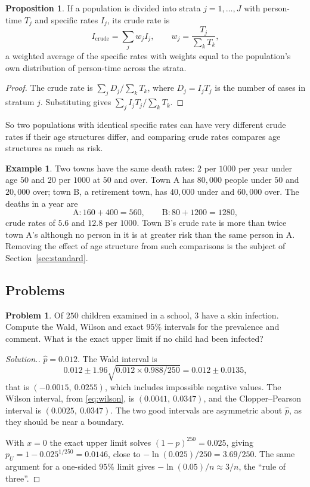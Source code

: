 \documentclass[11pt,a4paper]{article}
\numberwithin{equation}{section}
\theoremstyle{definition}
\newtheorem{exa}[thm]{Example}
\newtheorem{prop}[thm]{Proposition}
\newtheorem{problemx}{Problem}[subsection]
\newenvironment{problem}{\begin{problemx}}{\end{problemx}}
\newenvironment{solution}
  {\renewcommand{\qedsymbol}{}\begin{proof}[\textit{Solution}.]}
  {\end{proof}}
\begin{document}
\begin{prop}
\label{prop:crude}
If a population is divided into strata $j = 1, \dots, J$ with person-time $T_j$ and specific rates $I_j$, its crude rate is
\[
I_{\text{crude}} = \sum_j w_j I_j, \qquad w_j = \frac{T_j}{\sum_k T_k} ,
\]
a weighted average of the specific rates with weights equal to the population's own distribution of person-time across the strata.
\end{prop}

\begin{proof}
The crude rate is $\sum_j D_j/\sum_k T_k$, where $D_j = I_j T_j$ is the number of cases in stratum $j$. Substituting gives $\sum_j I_j T_j/\sum_k T_k$.
\end{proof}

So two populations with identical specific rates can have very different crude rates if their age structures differ, and comparing
crude rates compares age structures as much as risk.

\begin{exa}
\label{exa:towns}
Two towns have the same death rates: $2$ per $1000$ per year under age $50$ and $20$ per $1000$ at $50$ and over. Town A has $80{,}000$ people under
$50$ and $20{,}000$ over; town B, a retirement town, has $40{,}000$ under and $60{,}000$ over. The deaths in a year are
\[
\text{A}: 160 + 400 = 560, \qquad \text{B}: 80 + 1200 = 1280 ,
\]
crude rates of $5.6$ and $12.8$ per $1000$. Town B's crude rate is more than twice town A's although no person in it is at greater risk than
the same person in A. Removing the effect of age structure from such comparisons is the subject of Section~\ref{sec:standard}.
\end{exa}

\subsection{Problems}

\begin{problem}
Of $250$ children examined in a school, $3$ have a skin infection. Compute the Wald, Wilson and exact $95\%$ intervals for the
prevalence and comment. What is the exact upper limit if no child had been infected?
\end{problem}

\begin{solution}
$\hat p = 0.012$. The Wald interval is
\[
0.012 \pm 1.96\sqrt{0.012 \times 0.988/250} = 0.012 \pm 0.0135 ,
\]
that is $(-0.0015,\ 0.0255)$, which includes impossible negative values. The Wilson interval, from \eqref{eq:wilson},
is $(0.0041,\ 0.0347)$, and the Clopper--Pearson interval is $(0.0025,\ 0.0347)$. The two good intervals are asymmetric about
$\hat p$, as they should be near a boundary.

With $x = 0$ the exact upper limit solves $(1 - p)^{250} = 0.025$, giving $p_U = 1 - 0.025^{1/250} = 0.0146$, close to
$-\ln(0.025)/250 = 3.69/250$. The same argument for a one-sided $95\%$ limit gives $-\ln(0.05)/n \approx 3/n$, the ``rule of three''.
\end{solution}
\end{document}
